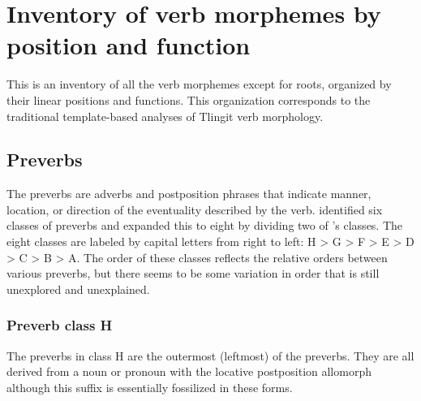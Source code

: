 
\section{Inventory of verb morphemes by position and function}\label{sec:inventory}

This is an inventory of all the verb morphemes except for roots, organized by their linear positions and functions.
This organization corresponds to the traditional template-based analyses of Tlingit verb morphology.

\subsection{Preverbs}\label{sec:inventory-preverb}

The preverbs are adverbs and postposition phrases that indicate manner, location, or direction
	of the eventuality described by the verb.
\textcite[132–134]{leer:1991} identified six classes of preverbs and \textcite[686]{crippen:2019} expanded this to eight by dividing two of \citeauthor{leer:1991}’s classes.
The eight classes are labeled by capital letters from right to left: H > G > F > E > D > C > B > A.
The order of these classes reflects the relative orders between various preverbs, but there seems to be some variation in order that is still unexplored and unexplained.

\ProvideDocumentCommand{\removeitemvspace} {} {\vspace{\dimexpr-\itemsep-\parsep+1pt}}

\subsubsection{Preverb class H}\label{sec:inventory-preverb-H}

The preverbs in class H are the outermost (leftmost) of the preverbs.
They are all derived from a noun or pronoun with the locative postposition allomorph 
	although this suffix is essentially fossilized in these forms.

